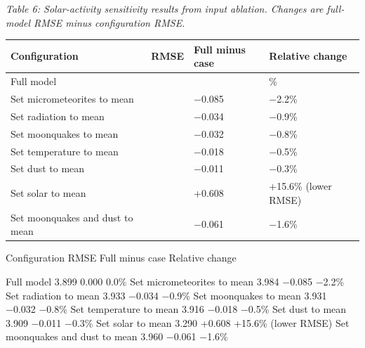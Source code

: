 \emph{Table 6: Solar-activity sensitivity results from input ablation. Changes are full-model RMSE minus configuration RMSE.}

{\def\LTcaptype{none} %
\begin{longtable}[]{@{}
  >{\centering\arraybackslash}p{}
  >{\centering\arraybackslash}p{}
  >{\centering\arraybackslash}p{}
  >{\centering\arraybackslash}p{}@{}}
\toprule\noalign{}
\begin{minipage}[b]{\linewidth}\centering
\textbf{Configuration}
\end{minipage} & \begin{minipage}[b]{\linewidth}\centering
\textbf{RMSE}
\end{minipage} & \begin{minipage}[b]{\linewidth}\centering
\textbf{Full minus case}
\end{minipage} & \begin{minipage}[b]{\linewidth}\centering
\textbf{Relative change}
\end{minipage} \\
\midrule\noalign{}
\endhead
\bottomrule\noalign{}
\endlastfoot
Full model & 3.899 & 0.000 & 0.0\% \\
Set micrometeorites to mean & 3.984 & −0.085 & −2.2\% \\
Set radiation to mean & 3.933 & −0.034 & −0.9\% \\
Set moonquakes to mean & 3.931 & −0.032 & −0.8\% \\
Set temperature to mean & 3.916 & −0.018 & −0.5\% \\
Set dust to mean & 3.909 & −0.011 & −0.3\% \\
Set solar to mean & 3.290 & +0.608 & +15.6\% (lower RMSE) \\
Set moonquakes and dust to mean & 3.960 & −0.061 & −1.6\% \\
\end{longtable}
}

Configuration RMSE Full minus case Relative change

Full model 3.899 0.000 0.0\% Set micrometeorites to mean 3.984 −0.085 −2.2\% Set radiation to mean 3.933 −0.034 −0.9\% Set moonquakes to mean 3.931 −0.032 −0.8\% Set temperature to mean 3.916 −0.018 −0.5\% Set dust to mean 3.909 −0.011 −0.3\% Set solar to mean 3.290 +0.608 +15.6\% (lower RMSE) Set moonquakes and dust to mean 3.960 −0.061 −1.6\%

